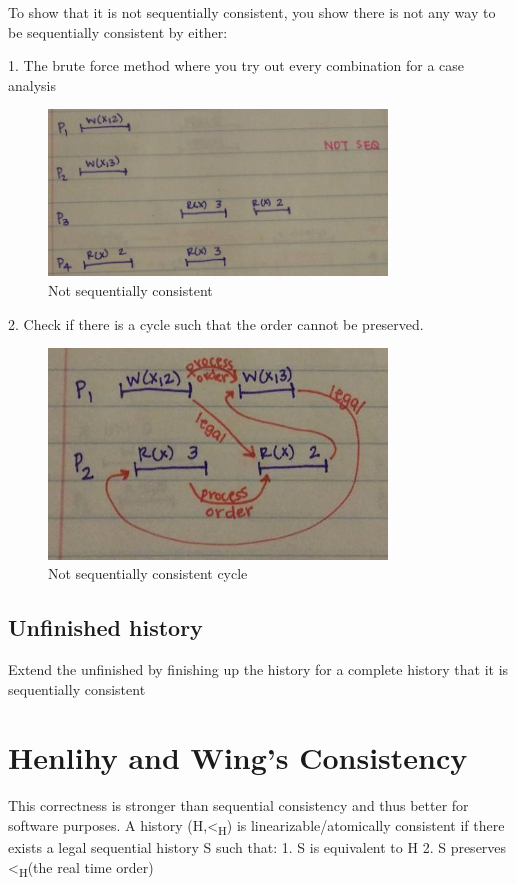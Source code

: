 \documentclass[twoside]{article}
\begin{document}
To show that it is not sequentially consistent, you show there is not any way to be sequentially consistent by either:

1.	The brute force method where you try out every combination for a case analysis
\begin{figure}[ht!]
\centering
\includegraphics[width=90mm]{pic_6.jpg}
\caption{Not sequentially consistent \label{overflow}}
\end{figure}

2.	Check if there is a cycle such that the order cannot be preserved.

\begin{figure}[ht!]
\centering
\includegraphics[width=90mm]{pic_4.jpg}
\caption{Not sequentially consistent cycle \label{overflow}}
\end{figure}


\subsection{Unfinished history}

Extend the unfinished by finishing up the history for a complete history that it is sequentially consistent

\section{Henlihy and Wing’s Consistency}

This correctness is stronger than sequential consistency and thus better for software purposes.
A history (H,\textless\textsubscript{H}) is linearizable/atomically consistent if there exists a  legal sequential history S such that:
1.	S is equivalent to H
2.	S preserves \textless\textsubscript{H}(the real time order)
\end{document}
